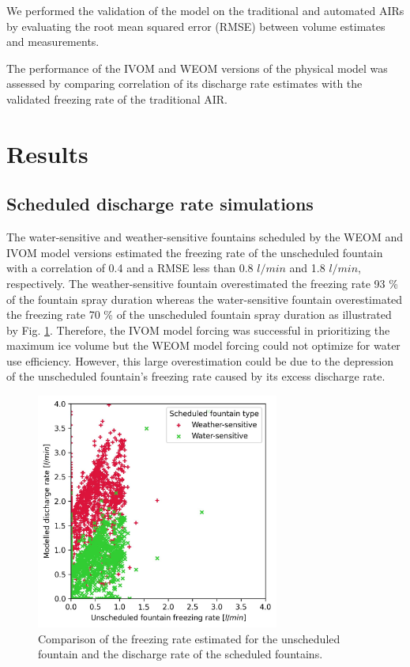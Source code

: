 \documentclass[tc, manuscript]{copernicus}
\begin{document}
We performed the validation of the model on the traditional and automated AIRs by evaluating the root mean
squared error (RMSE) between volume estimates and measurements. 

The performance of the IVOM and WEOM versions of the physical model was assessed by comparing correlation of its
discharge rate estimates with the validated freezing rate of the traditional AIR.

\section{Results}

\subsection{Scheduled discharge rate simulations}

The water-sensitive and weather-sensitive fountains scheduled by the WEOM and IVOM model versions estimated the
freezing rate of the unscheduled fountain with a correlation of 0.4 and a RMSE less than 0.8 $l/min$ and 1.8
$l/min$, respectively. The weather-sensitive fountain overestimated the freezing rate 93 \% of the fountain spray
duration whereas the water-sensitive fountain overestimated the freezing rate 70 \% of the unscheduled fountain
spray duration as illustrated by Fig. \ref{fig:simvsreal}. Therefore, the IVOM model forcing was successful in
prioritizing the maximum ice volume but the WEOM model forcing could not optimize for water use efficiency.
However, this large overestimation could be due to the depression of the unscheduled fountain's freezing rate
caused by its excess discharge rate. 

\begin{figure}[t]
\includegraphics[width=8cm]{Figures/simvsreal.jpg}

\caption{ Comparison of the freezing rate estimated for the unscheduled fountain and the discharge rate of the
scheduled fountains. }

\label{fig:simvsreal}
\end{figure}
\end{document}
